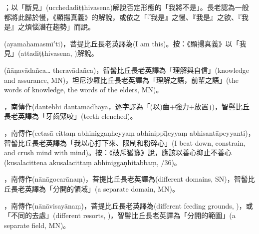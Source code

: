 \startitemgroup[noteitems]
\item{}；以「斷見」(ucchedadiṭṭhivasena)解說否定形態的「我將不是」。長老認為一般都將此歸於慢，《顯揚真義》的解說，或依之「『我是』之慢、『我是』之欲、『我是』之煩惱潛在趨勢」而說。
\item{}(ayamahamasmī’ti)，菩提比丘長老英譯為(I am this)。按：《顯揚真義》以「我見」(attadiṭṭhivasena, )解說。
\stopitemgroup

\startitemgroup[noteitems]
\item{}(ñāṇavādañca… theravādañca)，智髻比丘長老英譯為「理解與自信」(knowledge and assurance, MN)，坦尼沙羅比丘長老英譯為「理解之語，前輩之語」(the words of knowledge, the words of the elders, MN)。
\stopitemgroup

\startitemgroup[noteitems]
\item{}，南傳作(dantebhi dantamādhāya，逐字譯為「(以)齒+強力+放置」)，智髻比丘長老英譯為「牙齒緊咬」(teeth clenched)。
\item{}，南傳作(cetasā cittaṃ abhiniggaṇheyyaṃ abhinippīḷeyyaṃ abhisantāpeyyanti)，智髻比丘長老英譯為「我以心打下來、限制和粉碎心」(I beat down, constrain, and crush mind with mind)。按：《破斥猶豫》說，應該以善心抑止不善心(kusalacittena akusalacittaṃ abhiniggaṇhitabbaṃ, /36)。
\stopitemgroup

\startitemgroup[noteitems]
\item{}，南傳作(nānāgocarānaṃ)，菩提比丘長老英譯為(different domains, SN)，智髻比丘長老英譯為「分開的領域」(a separate domain, MN)。
\item{}，南傳作(nānāvisayānaṃ)，菩提比丘長老英譯為(different feeding grounds, )，或「不同的去處」(different resorts, )，智髻比丘長老英譯為「分開的範圍」(a separate field, MN)。
\stopitemgroup

